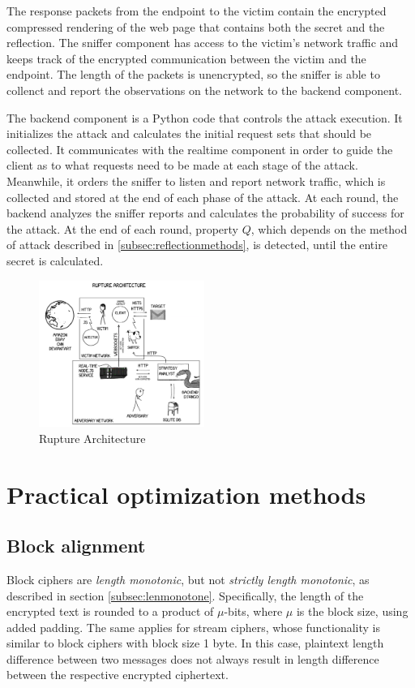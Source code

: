 \documentclass{sig-alternate-05-2015}
\begin{document}
The response packets from the endpoint to the victim contain the encrypted
compressed rendering of the web page that contains both the secret and the
reflection. The sniffer component has access to the victim's network traffic and
keeps track of the encrypted communication between the victim and the endpoint.
The length of the packets is unencrypted, so the sniffer is able to collenct and
report the observations on the network to the backend component.

The backend component is a Python code that controls the attack execution. It
initializes the attack and calculates the initial request sets that should be
collected. It communicates with the realtime component in order to guide the
client as to what requests need to be made at each stage of the attack.
Meanwhile, it orders the sniffer to listen and report network traffic, which is
collected and stored at the end of each phase of the attack. At each round, the
backend analyzes the sniffer reports and calculates the probability of success
for the attack. At the end of each round, property $Q$, which depends on the
method of attack described in \ref{subsec:reflectionmethods}, is detected, until
the entire secret is calculated.

   \begin{figure}[thpb]
      \centering
      \includegraphics[width=0.48\textwidth]{architecture.png}
      \caption{Rupture Architecture}
   \end{figure}

\section{Practical optimization methods}\label{app:optimization}

\subsection{Block alignment}\label{subsec:blockalign}
Block ciphers are \textit{length monotonic}, but not \textit{strictly length
monotonic}, as described in section \ref{subsec:lenmonotone}. Specifically, the
length of the encrypted text is rounded to a product of $\mu$-bits, where $\mu$
is the block size, using added padding. The same applies for stream ciphers,
whose functionality is similar to block ciphers with block size 1 byte. In this
case, plaintext length difference between two messages does not always result in
length difference between the respective encrypted ciphertext.
\end{document}
